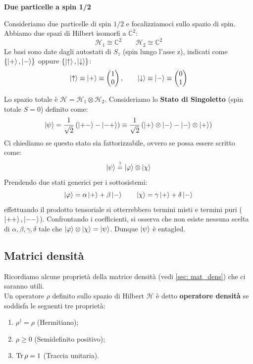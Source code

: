 \begin{example}
    \textbf{Due particelle a spin 1/2}

    Consideriamo due particelle di spin \( 1/2 \) e focalizziamoci sullo spazio di spin.
    Abbiamo due spazi di Hilbert isomorfi a \( \mathbb{C}^2 \):
    \[
        \mathcal{H}_1 \cong \mathbb{C}^2 \qquad \mathcal{H}_2 \cong \mathbb{C}^2
    \]
    Le basi sono date dagli autostati di \( S_z \) (spin lungo l'asse z), indicati come \( \{\ket{+}, \ket{-}\} \) oppure \( \{\ket{\uparrow}, \ket{\downarrow}\} \):
    \[
        \ket{\uparrow} \equiv \ket{+} \equiv \begin{pmatrix} 1 \\ 0 \end{pmatrix}, \qquad \ket{\downarrow} \equiv \ket{-} \equiv \begin{pmatrix} 0 \\ 1 \end{pmatrix}
    \]

    Lo spazio totale è \( \mathcal{H} = \mathcal{H}_1 \otimes \mathcal{H}_2 \).
    Consideriamo lo \textbf{Stato di Singoletto} (spin totale \( S=0 \)) definito come:
    \[
        \ket{\psi} = \frac{1}{\sqrt{2}} \left( \ket{+ -} - \ket{- +} \right) \equiv \frac{1}{\sqrt{2}} \left( \ket{+} \otimes \ket{-} - \ket{-} \otimes \ket{+} \right)
    \]
    Ci chiediamo se questo stato sia fattorizzabile, ovvero se possa essere scritto come:
    \[
        \ket{\psi} \overset{?}{=} \ket{\varphi} \otimes \ket{\chi}
    \]
    Prendendo due stati generici per i sottosistemi:
    \[
        \ket{\varphi} = \alpha\ket{+} + \beta\ket{-} \qquad \ket{\chi} = \gamma\ket{+} + \delta\ket{-}
    \]
    effettuando il prodotto tensoriale si otterrebbero termini misti e termini puri (\( \ket{++}, \ket{--} \)). Confrontando i coefficienti, si osserva che non esiste nessuna scelta di \( \alpha, \beta, \gamma, \delta \) tale che \( \ket{\varphi} \otimes \ket{\chi} = \ket{\psi} \). Dunque \(\ket{\psi}\) è entagled.   
\end{example}

\subsection{Matrici densità}

Ricordiamo alcune proprietà della matrice densità (vedi \ref{sec: mat_dens}) che ci saranno utili. \\Un operatore $\rho$ definito sullo spazio di Hilbert $\mathcal{H}$ è detto \textbf{operatore densità} se soddisfa le seguenti tre proprietà:
\begin{enumerate}
    \item $\rho^\dagger = \rho$ (Hermitiano);
    \item $\rho \geq 0$ (Semidefinito positivo);
    \item $\Tr \rho = 1$ (Traccia unitaria).
\end{enumerate}

